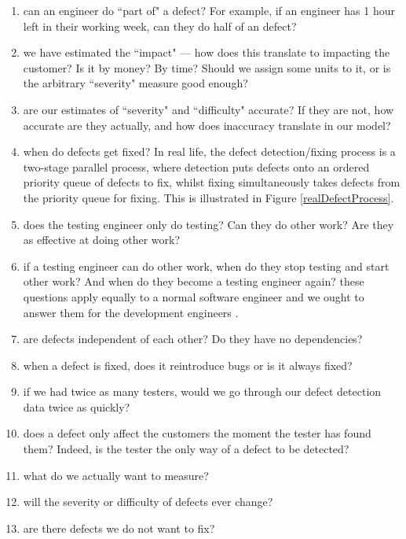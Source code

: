 \begin{enumerate}
	\item can an engineer do ``part of" a defect?
	For example, if an engineer has 1 hour left in their working week, can they do half of an \easy
defect? \label{openQuestOne}
	\item we have estimated the ``impact" --- how does this translate to impacting the customer?
	Is it by money?
	By time?
	Should we assign some units to it, or is the arbitrary ``severity" measure good enough?
	\label{openQuestTwo}
	\item are our estimates of ``severity" and ``difficulty" accurate?
	If they are not, how accurate are they actually, and how does inaccuracy translate in our model?
	\label{openQuestThree}
	\item when do defects get fixed?
	In real life, the defect detection/fixing process is a two-stage parallel process, where detection
puts defects onto an ordered priority queue of defects to fix, whilst fixing simultaneously takes
defects from the priority queue for fixing.
	This is illustrated in Figure \ref{realDefectProcess}. \label{openQuestFour}
	\item does the testing engineer only do testing?
	Can they do other work?
	Are they as effective at doing other work? \label{openQuestFive}
	\item if a testing engineer can do other work, when do they stop testing and start other work?
	And when do they become a testing engineer again? these questions apply equally to a normal software engineer and we ought to answer them for
the development engineers \label{openQuestSix}. 
	\item are defects independent of each other? Do they have no dependencies? \label{openQuestSeven}
	\item when a defect is fixed, does it reintroduce bugs or is it always fixed?
	\label{openQuestEight}
	\item if we had twice as many testers, would we go through our defect detection data twice as
quickly? \label{openQuestNine}
	\item does a defect only affect the customers the moment the tester has found them?
	Indeed, is the tester the only way of a defect to be detected? \label{openQuestTen}
	\item what do we actually want to measure? \label{openQuestEleven}
	\item will the severity or difficulty of defects ever change? \label{openQuestTwelve}
  \item are there defects we do not want to fix? \label{openQuestThirteen}
\end{enumerate}

